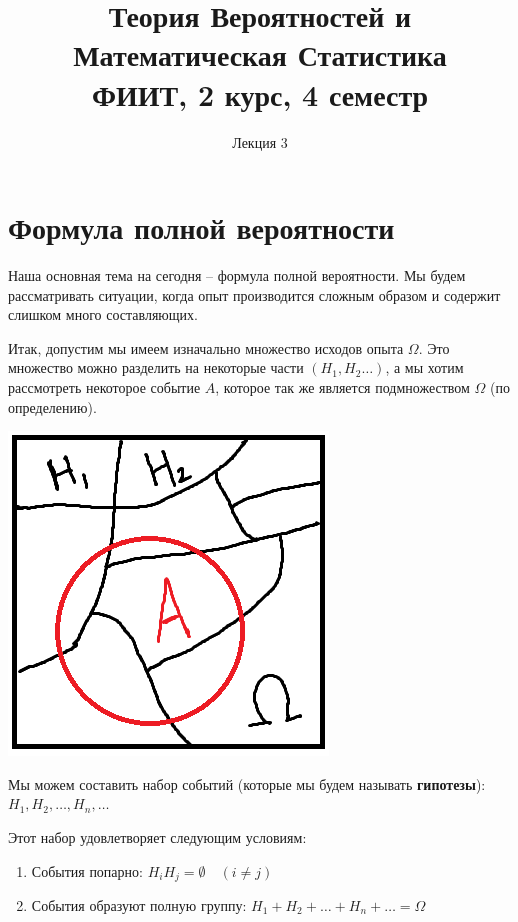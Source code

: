 \documentclass{article}
\title{Теория Вероятностей и Математическая Статистика\\
ФИИТ, 2 курс, 4 семестр}
\author{Лекция 3}
\begin{document}
\maketitle

\section {Формула полной вероятности}

Наша основная тема на сегодня -- формула полной вероятности.
Мы будем рассматривать ситуации, когда опыт производится сложным образом и содержит слишком много составляющих.

\quad

Итак, допустим мы имеем изначально множество исходов опыта $\Omega$. Это множество можно разделить на некоторые части $(H_1, H_2 \ldots)$, а мы хотим рассмотреть некоторое событие $A$, которое так же является подмножеством $\Omega$ (по определению).

\begin{center}
    \includegraphics[scale=0.6]{1.png}
\end{center}

Мы можем составить набор событий (которые мы будем называть \textbf{гипотезы}): $H_1, H_2, \ldots, H_n, \ldots$

Этот набор удовлетворяет следующим условиям:

\begin{enumerate}
\item События попарно: $H_iH_j = \emptyset\quad (i \not= j)$
\item События образуют полную группу: $H_1 + H_2 + \ldots + H_n + \ldots = \Omega$
\end{enumerate}
\end{document}
